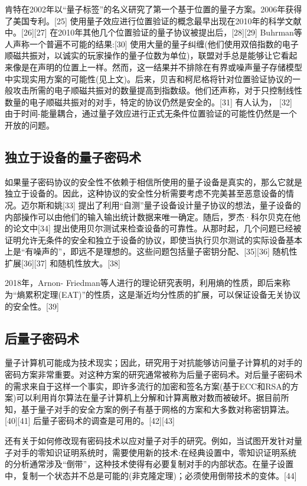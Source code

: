 肯特在2002年以“量子标签”的名义研究了第一个基于位置的量子方案。2006年获得了美国专利。[25] 使用量子效应进行位置验证的概念最早出现在2010年的科学文献中。[26][27] 在2010年其他几个位置验证的量子协议被提出后，[28][29] Buhrman等人声称一个普遍不可能的结果:[30] 使用大量的量子纠缠(他们使用双倍指数的电子顺磁共振对，以诚实的玩家操作的量子位数为单位)，联盟对手总是能够让它看起来像是在声明的位置上一样。然而，这一结果并不排除在有界或噪声量子存储模型中实现实用方案的可能性(见上文)。后来，贝吉和柯尼格将针对位置验证协议的一般攻击所需的电子顺磁共振对的数量提高到指数级。他们还声称，对于只控制线性数量的电子顺磁共振对的对手，特定的协议仍然是安全的。[31] 有人认为， [32] 由于时间-能量耦合，通过量子效应进行正式无条件位置验证的可能性仍然是一个开放的问题。

\subsection{独立于设备的量子密码术}
如果量子密码协议的安全性不依赖于相信所使用的量子设备是真实的，那么它就是独立于设备的。因此，这种协议的安全性分析需要考虑不完美甚至恶意设备的情况。迈尔斯和姚[33] 提出了利用“自测”量子设备设计量子协议的想法，量子设备的内部操作可以由他们的输入输出统计数据来唯一确定。随后，罗杰·科尔贝克在他的论文中[34] 提出使用贝尔测试来检查设备的可靠性。从那时起，几个问题已经被证明允许无条件的安全和独立于设备的协议，即使当执行贝尔测试的实际设备基本上是“有噪声的”，即远不是理想的。这些问题包括量子密钥分配、[35][36] 随机性扩展[36][37] 和随机性放大。[38]

2018年，Arnon- Friedman等人进行的理论研究表明，利用熵的性质，即后来称为“熵累积定理(EAT)”的性质，这是渐近均分性质的扩展，可以保证设备无关协议的安全性。[39]

\subsection{后量子密码术}
量子计算机可能成为技术现实；因此，研究用于对抗能够访问量子计算机的对手的密码方案非常重要。对这种方案的研究通常被称为后量子密码术。对后量子密码术的需求来自于这样一个事实，即许多流行的加密和签名方案(基于ECC和RSA的方案)可以利用肖尔算法在量子计算机上分解和计算离散对数而被破坏。据目前所知，基于量子对手的安全方案的例子有基于网格的方案和大多数对称密钥算法。[40][41] 后量子密码术的调查是可用的。[42][43]

还有关于如何修改现有密码技术以应对量子对手的研究。例如，当试图开发针对量子对手的零知识证明系统时，需要使用新的技术:在经典设置中，零知识证明系统的分析通常涉及“倒带”，这种技术使得有必要复制对手的内部状态。在量子设置中，复制一个状态并不总是可能的(非克隆定理)；必须使用倒带技术的变体。[44]

